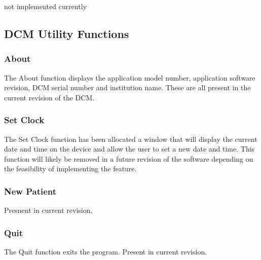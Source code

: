 \documentclass[12pt]{article}
\begin{document}
not implemented currently

\newpage
\subsection{DCM Utility Functions}
\subsubsection{About}
The About function displays the application model number, application software revision, DCM serial number and institution name. These are all present in the current revision of the DCM.

\subsubsection{Set Clock}
The Set Clock function has been allocated a window that will display the current date and time on the device and allow the user to set a new date and time. This function will likely be removed in a future revision of the software depending on the feasibility of implementing the feature.

\subsubsection{New Patient}
Presnent in current revision.

\subsubsection{Quit}
The Quit function exits the program. Present in current revision.
\end{document}
